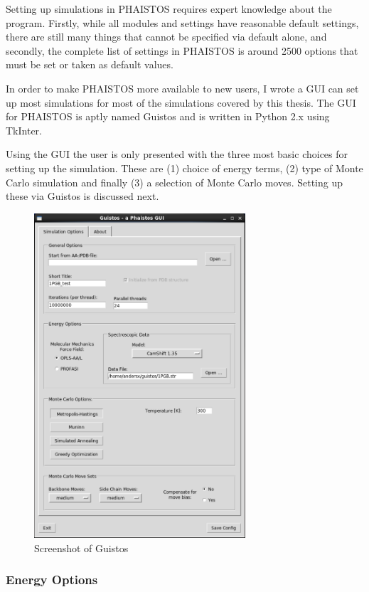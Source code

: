 Setting up simulations in PHAISTOS requires expert knowledge about the program. 
Firstly, while all modules and settings have reasonable default settings, there are still many things that cannot be specified via default alone, and secondly, the complete list of settings in PHAISTOS is around 2500 options that must be set or taken as default values.

In order to make PHAISTOS more available to new users, I wrote a GUI can set up most simulations for most of the simulations covered by this thesis.
The GUI for PHAISTOS is aptly named Guistos and is written in Python 2.x using TkInter.

Using the GUI the user is only presented with the three most basic choices for setting up the simulation.
These are (1) choice of energy terms, (2) type of Monte Carlo simulation and finally (3) a selection of Monte Carlo moves.
Setting up these via Guistos is discussed next.

\begin{figure}
    \centering
    \includegraphics[width=0.70\textwidth]{figures/guistos.pdf}
    \caption{Screenshot of Guistos}
    \label{fig:guistos}
\end{figure}

\subsubsection{Energy Options}


